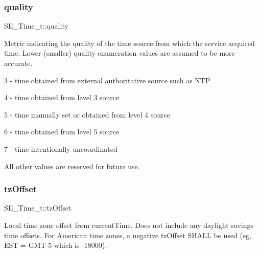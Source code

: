 \subsubsection{\texorpdfstring{quality}{quality}}
{\footnotesize\ttfamily S\+E\+\_\+\+Time\+\_\+t\+::quality}

Metric indicating the quality of the time source from which the service acquired time. Lower (smaller) quality enumeration values are assumed to be more accurate.

3 -\/ time obtained from external authoritative source such as N\+TP

4 -\/ time obtained from level 3 source

5 -\/ time manually set or obtained from level 4 source

6 -\/ time obtained from level 5 source

7 -\/ time intentionally uncoordinated

All other values are reserved for future use. \mbox{\label{group__Time_ga3017647596cbc5718fc84d97f7738684}} 
\subsubsection{\texorpdfstring{tz\+Offset}{tzOffset}}
{\footnotesize\ttfamily S\+E\+\_\+\+Time\+\_\+t\+::tz\+Offset}

Local time zone offset from current\+Time. Does not include any daylight savings time offsets. For American time zones, a negative tz\+Offset S\+H\+A\+LL be used (eg, E\+ST = G\+M\+T-\/5 which is -\/18000). 